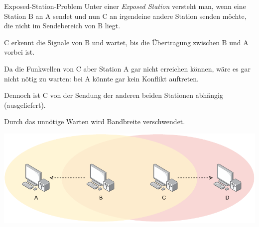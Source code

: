 \begin{defi}{Exposed-Station-Problem}
    Unter einer \emph{Exposed Station} versteht man, wenn eine Station B an A sendet und nun C an irgendeine andere Station senden möchte, die nicht im Sendebereich von B liegt.

    C erkennt die Signale von B und wartet, bis die Übertragung zwischen B und A vorbei ist.

    Da die Funkwellen von C aber Station A gar nicht erreichen können, wäre es gar nicht nötig zu warten: bei A könnte gar kein Konflikt auftreten.

    Dennoch ist C von der Sendung der anderen beiden Stationen abhängig (ausgeliefert).

    Durch das unnötige Warten wird Bandbreite verschwendet.

    \centering
    \includegraphics[width=.6\textwidth]{includes/figures/example_exposed_station.pdf}
\end{defi}

